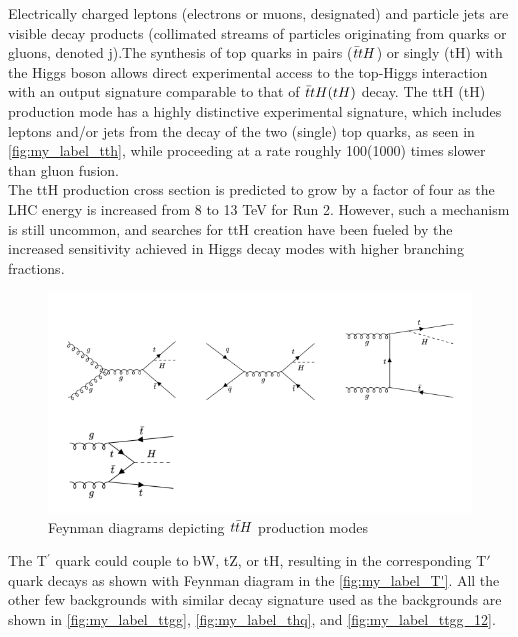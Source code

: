 Electrically charged leptons (electrons or muons, designated) and particle jets are visible decay products (collimated streams of particles originating from quarks or gluons, denoted j).The synthesis of top quarks in pairs ($\Bar{t}tH$)  or singly (tH) with the Higgs boson allows direct experimental access to the top-Higgs interaction with an output signature comparable to that of  $\Bar{t}tH (tH)$ decay. The ttH (tH) production mode has a highly distinctive experimental signature, which includes leptons and/or jets from the decay of the two (single) top quarks, as seen in \autoref{fig:my_label_tth}, while proceeding at a rate roughly 100(1000) times slower than gluon fusion.\\
The ttH production cross section is predicted to grow by a factor of four as the LHC energy is increased from 8 to 13 TeV for Run 2. However, such a mechanism is still uncommon, and searches for ttH creation have been fueled by the increased sensitivity achieved in Higgs decay modes with higher branching fractions. \\
\begin{figure}[H]
    \centering
    \includegraphics[scale=0.7]{figure_1/tth_1.png}
    \caption{Feynman diagrams depicting $t\Bar{t}H$ production modes}
    \label{fig:my_label_tth}
\end{figure}
The T$^'$ quark could couple to bW, tZ, or tH, resulting in the corresponding T$'$ quark decays as shown with Feynman diagram in the \autoref{fig:my_label_T'}. All the other few backgrounds with similar decay signature used as the backgrounds are shown in \autoref{fig:my_label_ttgg}, \autoref{fig:my_label_thq}, and \autoref{fig:my_label_ttgg_12}.\\


